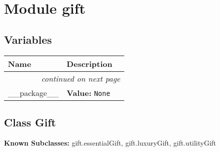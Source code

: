 %
%
%


\section{Module gift}

    \label{gift}


  \subsection{Variables}

    \vspace{-1cm}
\hspace{\varindent}\begin{longtable}{|p{\varnamewidth}|p{\vardescrwidth}|l}
\cline{1-2}
\cline{1-2} \centering \textbf{Name} & \centering \textbf{Description}& \\
\cline{1-2}
\endhead\cline{1-2}\multicolumn{3}{r}{\small\textit{continued on next page}}\\\endfoot\cline{1-2}
\endlastfoot\raggedright \_\-\_\-p\-a\-c\-k\-a\-g\-e\-\_\-\_\- & \raggedright \textbf{Value:} 
{\tt None}&\\
\cline{1-2}
\end{longtable}



\subsection{Class Gift}

    \label{gift:Gift}
\textbf{Known Subclasses:}
gift.essentialGift,
    gift.luxuryGift,
    gift.utilityGift



